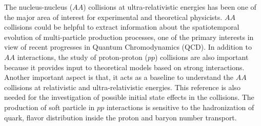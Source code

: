 \documentclass{article}
\newcommand{\sqrts}{\mbox{$\sqrt{\mathrm{s}}$}}
\newcommand{\ppt}{$p_{\rm T}$}
\begin{document}

The nucleus-nucleus ($AA$) collisions at ultra-relativistic energies has been one of the major area of interest for experimental and theoretical physicists. $AA$ collisions could be helpful to extract information about the spatiotemporal evolution of multi-particle production processes, one of the primary interests in view of recent progresses in Quantum Chromodynamics (QCD). In addition to $AA$ interactions, the study of proton-proton ($pp$) collisions are also important because it provides input to theoretical models based on strong interactions. Another important aspect is that, it acts as a baseline to understand the $AA$ collisions at relativistic and ultra-relativistic energies. This reference is also needed for the investigation of possible initial state effects in the collisions. The production of soft particle in $pp$ interactions is sensitive to the hadronization of quark, flavor distribution inside the proton and baryon number transport. 
\end{document}
